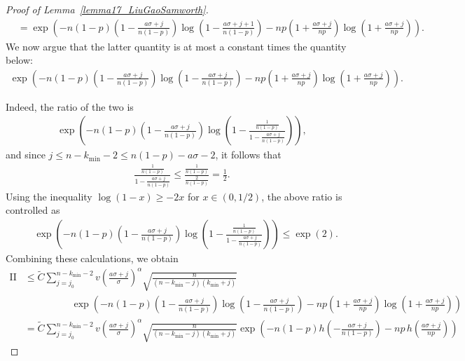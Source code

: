 \documentclass{article}
\begin{document}
\begin{proof}[Proof of Lemma~\ref{lemma17_LiuGaoSamworth}]
\begin{align*}
& = \exp\left(-n(1-p)\left(1 - \frac{a\sigma + j}{n(1-p)}\right) \log\left(1 - \frac{a \sigma + j + 1}{n(1-p)}\right) - np\left(1 + \frac{a\sigma + j}{np}\right) \log\left(1 + \frac{a\sigma + j}{np}\right)\right).
\end{align*}
We now argue that the latter quantity is at most a constant times the quantity below:
\begin{align*}
\exp\left(-n(1-p)\left(1 - \frac{a\sigma + j}{n(1-p)}\right) \log\left(1 - \frac{a \sigma + j}{n(1-p)}\right) - np\left(1 + \frac{a\sigma + j}{np}\right) \log\left(1 + \frac{a\sigma + j}{np}\right)\right).
\end{align*}

Indeed, the ratio of the two is 
\begin{align*}
\exp\left(-n(1-p)\left(1 - \frac{a\sigma + j}{n(1-p)}\right) \log\left(1- \frac{\frac{1}{n(1-p)} }{1 - \frac{a \sigma + j}{n(1-p)}}\right)\right),
\end{align*}
and since $j \leq n - k_{\min} - 2 \leq n(1-p) - a\sigma - 2$, %
it follows that
\begin{align*}
\frac{\frac{1}{n(1-p)} }{1 - \frac{a \sigma + j}{n(1-p)}} \leq \frac{\frac{1}{n(1-p)} }{\frac{2}{n(1-p)}} = \frac{1}{2}.
\end{align*}
Using the inequality $\log(1-x) \geq -2x$ for $x \in (0,1/2)$, the above ratio is controlled as
\begin{align*}
&\exp\left(-n(1-p)\left(1 - \frac{a\sigma + j}{n(1-p)}\right) \log\left(1- \frac{\frac{1}{n(1-p)} }{1 - \frac{a \sigma + j}{n(1-p)}}\right)\right) \leq \exp(2).
\end{align*}
Combining these calculations, we obtain
\begin{align*}
\text{II} &\leq \tilde C \sum_{j=j_0}^{n-k_{\min} - 2} v\left(\frac{a\sigma + j}{\sigma}\right)^\alpha \sqrt{\frac{n}{(n-k_{\min}-j)(k_{\min} + j)}} \\
& \hspace{2cm}\exp\left(-n(1-p)\left(1 - \frac{a\sigma + j}{n(1-p)}\right) \log\left(1 - \frac{a \sigma + j}{n(1-p)}\right) - np\left(1 + \frac{a\sigma + j}{np}\right) \log\left(1 + \frac{a\sigma + j}{np}\right)\right)\\
& = \tilde C\sum_{j=j_0}^{n-k_{\min} - 2} v\left(\frac{a\sigma + j}{\sigma}\right)^\alpha \sqrt{\frac{n}{(n-k_{\min}-j)(k_{\min} + j)}} \exp\left(-n(1-p) h\left(-\frac{a\sigma + j}{n(1-p)}\right) - np \, h\left(\frac{a\sigma + j}{np}\right)\right)
\end{align*}

\end{proof}
\end{document}
